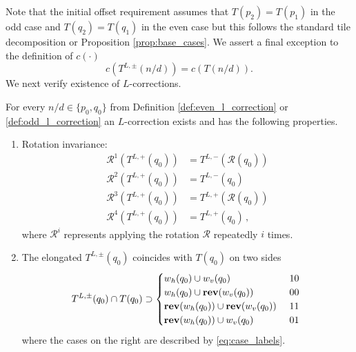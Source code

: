 \documentclass[12pt]{amsart}
\begin{document}
Note that the initial offset requirement assumes that $T(p_2) = T(p_1)$ in the odd case and $T(q_2) = T(q_1)$ in the even case
but this follows the standard tile decomposition or Proposition \ref{prop:base_cases}. We assert a final exception to the definition of $c(\cdot)$
\begin{equation} \label{eq:corner_l_correction}
c(T^{L,\pm}(n/d)) = c(T(n/d)).
\end{equation}
We next verify existence of $L$-corrections. 


\begin{lemma} \label{lemma:l_correc_properties}
	For every $n/d \in \{p_0, q_0\}$ from Definition \ref{def:even_l_correction} or \ref{def:odd_l_correction}
	an $L$-correction exists and has the following properties. 
	\begin{enumerate} %
		\item Rotation invariance: 
		\begin{align*}
		\mathcal{R}^1(T^{L, +}(q_0)) &= T^{L, -}(\mathcal{R}(q_0)) \\
		\mathcal{R}^2(T^{L, +}(q_0)) &= T^{L,-}(q_0) \\
		\mathcal{R}^3(T^{L, +}(q_0)) &=  T^{L, +}(\mathcal{R}(q_0)) \\
		\mathcal{R}^4(T^{L, +}(q_0)) &= T^{L, +}(q_0) \, ,
		\end{align*}
		where $\mathcal{R}^i$ represents applying the rotation $\mathcal{R}$ repeatedly $i$ times.
		\item  The elongated $T^{L,\pm}(q_0)$ coincides with $T(q_0)$ on two sides
		\[
		T^{L, \pm}(q_0) \cap T(q_0) \supset
		\begin{cases}
			w_h(q_0) \cup w_v(q_0) &\mbox{ $1 0$  } \\
			w_h(q_0) \cup \mathop{\bf rev}(w_v(q_0))  &\mbox{ $0 0$ } \\
			\mathop{\bf rev}(w_h(q_0)) \cup \mathop{\bf rev}(w_v(q_0))  &\mbox{ $1 1$ } \\
			\mathop{\bf rev}(w_h(q_0)) \cup w_v(q_0)  &\mbox{ $0 1$ } 
		\end{cases}
		\] 
	where the cases on the right are described by \eqref{eq:case_labels}. 
	\end{enumerate}
\end{lemma}
\end{document}

